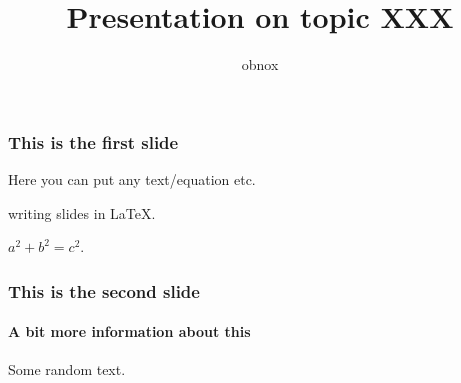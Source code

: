 \documentclass[10pt]{beamer}
\title{Presentation on  topic XXX}
\author{obnox}
\begin{document}
    \maketitle
    \begin{frame}
	    \frametitle{This is the first slide}
		Here you can put any text/equation etc. 

        writing slides in \LaTeX.

        $a^2 + b^2 = c^2$.


    \end{frame}
	\begin{frame}
		\frametitle{This is the second slide}
		\framesubtitle{A bit more information about this}
		Some random text.		
    \end{frame}
\end{document}
